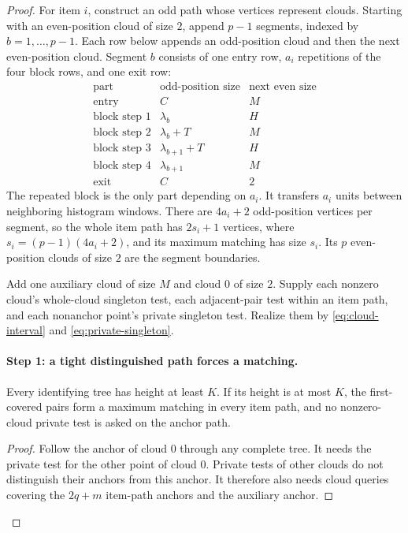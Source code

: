 \begin{proof}
For item $i$, construct an odd path whose vertices represent clouds.
Starting with an even-position cloud of size $2$, append $p-1$
segments, indexed by $b=1,\ldots,p-1$. Each row below appends an
odd-position cloud and then the next even-position cloud.
Segment $b$ consists of one entry row, $a_i$ repetitions of the
four block rows, and one exit row:
\[
 \begin{array}{c|c|c}
 \text{part}&\text{odd-position size}&\text{next even size}\\ \hline
 \text{entry}&C&M\\
 \text{block step 1}&\lambda_b&H\\
 \text{block step 2}&\lambda_b+T&M\\
 \text{block step 3}&\lambda_{b+1}+T&H\\
 \text{block step 4}&\lambda_{b+1}&M\\
 \text{exit}&C&2
 \end{array}
\]
The repeated block is the only part depending on $a_i$.
It transfers $a_i$ units between neighboring histogram windows.
There are $4a_i+2$ odd-position vertices per segment, so the
whole item path has $2s_i+1$ vertices, where
$s_i=(p-1)(4a_i+2)$, and its maximum matching has size $s_i$.
Its $p$ even-position clouds of size $2$ are the segment boundaries.

Add one auxiliary cloud of size $M$ and cloud $0$ of size $2$.
Supply each nonzero cloud's whole-cloud singleton test, each
adjacent-pair test within an item path, and each nonanchor point's
private singleton test. Realize them by \eqref{eq:cloud-interval}
and \eqref{eq:private-singleton}.

\paragraph{Step 1: a tight distinguished path forces a matching.}
\begin{claim}
Every identifying tree has height at least $K$. If its height is at
most $K$, the first-covered pairs form a maximum matching in every
item path, and no nonzero-cloud private test is asked on the anchor
path.
\end{claim}
\begin{proof}
Follow the anchor of cloud $0$ through any complete tree. It needs the private
test for the other point of cloud $0$. Private tests of other
clouds do not distinguish their anchors from this anchor.
It therefore also needs cloud queries covering the $2q+m$ item-path
anchors and the auxiliary anchor.


\end{proof}
\end{proof}
